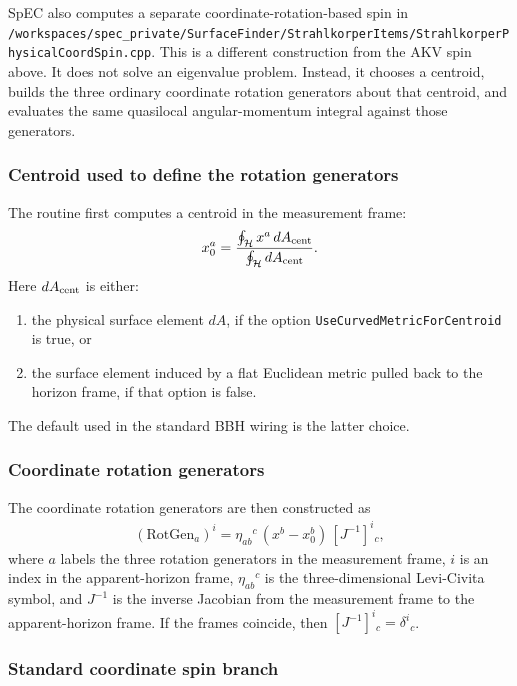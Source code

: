 SpEC also computes a separate coordinate-rotation-based spin in
\texttt{/workspaces/spec\_private/SurfaceFinder/StrahlkorperItems/StrahlkorperPhysicalCoordSpin.cpp}.
This is a different construction from the AKV spin above.  It does not solve an eigenvalue problem.  Instead, it chooses a centroid, builds the three ordinary coordinate rotation generators about that centroid, and evaluates the same quasilocal angular-momentum integral against those generators.

\subsubsection{Centroid used to define the rotation generators}

The routine first computes a centroid in the measurement frame:
\begin{align}
x_0^a
  = \frac{\oint_{\mathcal H} x^a\, dA_{\rm cent}}
         {\oint_{\mathcal H} dA_{\rm cent}}.
\end{align}
Here $dA_{\rm cent}$ is either:
\begin{enumerate}
\item the physical surface element $dA$, if the option \texttt{UseCurvedMetricForCentroid} is true, or
\item the surface element induced by a flat Euclidean metric pulled back to the horizon frame, if that option is false.
\end{enumerate}
The default used in the standard BBH wiring is the latter choice.

\subsubsection{Coordinate rotation generators}

The coordinate rotation generators are then constructed as
\begin{align}
(\mathrm{RotGen}_a)^i
  = \eta_{ab}{}^{c}\, (x^b-x_0^b)\, [J^{-1}]^i{}_c,
\label{eq:spec-rotgen}
\end{align}
where $a$ labels the three rotation generators in the measurement frame, $i$ is an index in the apparent-horizon frame, $\eta_{ab}{}^c$ is the three-dimensional Levi-Civita symbol, and $J^{-1}$ is the inverse Jacobian from the measurement frame to the apparent-horizon frame.  If the frames coincide, then $[J^{-1}]^i{}_c = \delta^i{}_c$.

\subsubsection{Standard coordinate spin branch}

